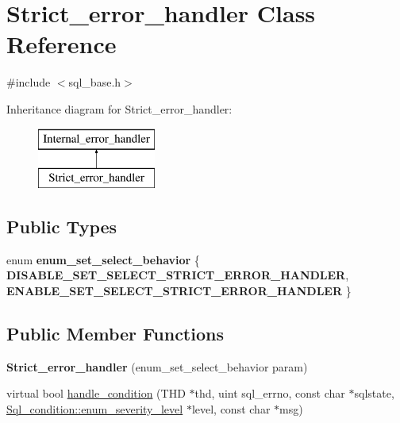 \hypertarget{classStrict__error__handler}{}\section{Strict\+\_\+error\+\_\+handler Class Reference}
\label{classStrict__error__handler}


{\ttfamily \#include $<$sql\+\_\+base.\+h$>$}

Inheritance diagram for Strict\+\_\+error\+\_\+handler\+:\begin{figure}[H]
\begin{center}
\leavevmode
\includegraphics[height=2.000000cm]{classStrict__error__handler}
\end{center}
\end{figure}
\subsection*{Public Types}
\begin{DoxyCompactItemize}
\item 
\mbox{\label{classStrict__error__handler_a752bafb7dd33f940f38fa0a0e1fe1f18}} 
enum {\bfseries enum\+\_\+set\+\_\+select\+\_\+behavior} \{ {\bfseries D\+I\+S\+A\+B\+L\+E\+\_\+\+S\+E\+T\+\_\+\+S\+E\+L\+E\+C\+T\+\_\+\+S\+T\+R\+I\+C\+T\+\_\+\+E\+R\+R\+O\+R\+\_\+\+H\+A\+N\+D\+L\+ER}, 
{\bfseries E\+N\+A\+B\+L\+E\+\_\+\+S\+E\+T\+\_\+\+S\+E\+L\+E\+C\+T\+\_\+\+S\+T\+R\+I\+C\+T\+\_\+\+E\+R\+R\+O\+R\+\_\+\+H\+A\+N\+D\+L\+ER}
 \}
\end{DoxyCompactItemize}
\subsection*{Public Member Functions}
\begin{DoxyCompactItemize}
\item 
\mbox{\label{classStrict__error__handler_a6fb90a05f5c35c710919c2568ba242e2}} 
{\bfseries Strict\+\_\+error\+\_\+handler} (enum\+\_\+set\+\_\+select\+\_\+behavior param)
\item 
virtual bool \mbox{\hyperlink{classStrict__error__handler_a81995f26b8587f9eb6b721e8e382aaeb}{handle\+\_\+condition}} (T\+HD $\ast$thd, uint sql\+\_\+errno, const char $\ast$sqlstate, \mbox{\hyperlink{classSql__condition_ab0602581e19cddb609bfe10c44be4e83}{Sql\+\_\+condition\+::enum\+\_\+severity\+\_\+level}} $\ast$level, const char $\ast$msg)
\end{DoxyCompactItemize}


